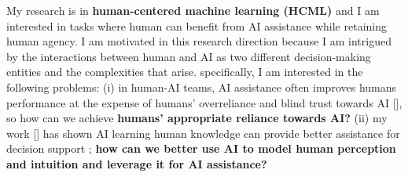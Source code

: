 


My research is in \textbf{human-centered machine learning (HCML)} and I am interested in tasks where human can benefit from AI assistance while retaining human agency. 
I am motivated in this research direction because I am intrigued by the interactions between human and AI as two different decision-making entities and the complexities that arise. 
specifically, I am interested in the following problems: 
(i) in human-AI teams, AI assistance often improves humans performance at the expense of humans' overreliance and blind trust towards AI [], so how can we achieve
\textbf{humans' appropriate reliance towards AI?}
(ii) my work [] has shown AI learning human knowledge can provide better assistance for decision support ; 
\textbf{how can we better use AI to model human perception and intuition and leverage it for AI assistance?}
\\
